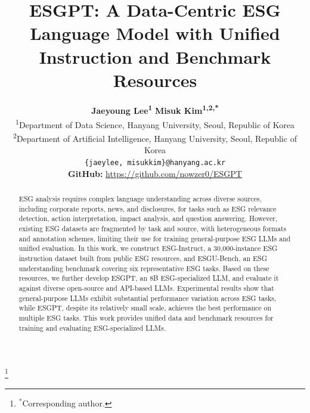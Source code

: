 \documentclass[11pt]{article}
\title{ESGPT: A Data-Centric ESG Language Model with Unified Instruction and Benchmark Resources}
\author{
  \textbf{Jaeyoung Lee\textsuperscript{1}}
  \quad
  \textbf{Misuk Kim\textsuperscript{1,2,*}}
\\
  \textsuperscript{1}Department of Data Science, Hanyang University, Seoul, Republic of Korea
\\
  \textsuperscript{2}Department of Artificial Intelligence, Hanyang University, Seoul, Republic of Korea
\\
  \texttt{\{jaeylee, misukkim\}@hanyang.ac.kr}
\\
\textbf{GitHub:} \url{https://github.com/nowzer0/ESGPT}
}
\begin{document}
\maketitle

\renewcommand{\thefootnote}{}
\footnote{$^*$Corresponding author.}

\begin{abstract}
ESG analysis requires complex language understanding across diverse sources, including corporate reports, news, and disclosures, for tasks such as ESG relevance detection, action interpretation, impact analysis, and question answering. However, existing ESG datasets are fragmented by task and source, with heterogeneous formats and annotation schemes, limiting their use for training general-purpose ESG LLMs and unified evaluation. In this work, we construct \textsf{ESG-Instruct}, a 30,000-instance ESG instruction dataset built from public ESG resources, and \textsf{ESGU-Bench}, an ESG understanding benchmark covering six representative ESG tasks. Based on these resources, we further develop \textsf{ESGPT}, an 8B ESG-specialized LLM, and evaluate it against diverse open-source and API-based LLMs. Experimental results show that general-purpose LLMs exhibit substantial performance variation across ESG tasks, while \textsf{ESGPT}, despite its relatively small scale, achieves the best performance on multiple ESG tasks. This work provides unified data and benchmark resources for training and evaluating ESG-specialized LLMs.

\end{abstract}
\end{document}
